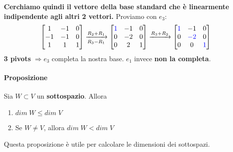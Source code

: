 \documentclass[a4paper, 12pt]{report}
\begin{document}
                    \textbf{Cerchiamo quindi il vettore della base standard che è linearmente indipendente agli altri 2 vettori.}
                    Proviamo con $e_3$:
                    $$
                    \begin{bmatrix}
                        1 & -1 & 0\\
                        -1 & -1 & 0\\
                        1 & 1 & 1
                    \end{bmatrix}
                    \xrightarrow[R_3-R_1]{R_2+R_1}
                    \begin{bmatrix}
                        \textcolor{blue}{1} & -1 & 0\\
                        0 & -2 & 0\\
                        0 & 2 & 1
                    \end{bmatrix}
                    \xrightarrow[]{R_3+R_2}
                    \begin{bmatrix}
                        \textcolor{blue}{1} & -1 & 0\\
                        0 & \textcolor{blue}{-2} & 0\\
                        0 & 0 & \textcolor{blue}{1}
                    \end{bmatrix}
                    $$
                    \textbf{3 pivots} $\Rightarrow e_3$ completa la nostra base. $e_1$ invece \textbf{non la completa}. 
            \paragraph{Proposizione} Sia $W \subset V$ un \textbf{sottospazio}. Allora
                    \begin{enumerate}
                        \item $dim \; W \leq dim \; V$
                        \item Se $W \neq V$, allora $dim \; W< dim \; V$
                    \end{enumerate}
                Questa proposizione è utile per calcolare le dimensioni dei sottospazi.
\end{document}
